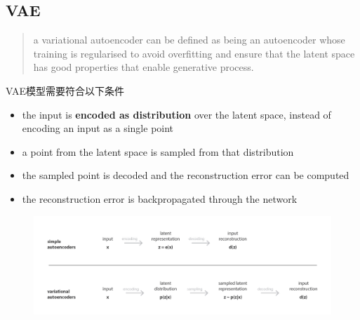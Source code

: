 \subsection{VAE}
\begin{quotation}
    a variational autoencoder can be defined as being an autoencoder whose training is
    regularised to avoid overfitting and ensure that the latent space has good properties
     that enable generative process.
\end{quotation}
VAE模型需要符合以下条件
\begin{itemize}
    \item the input is \textbf{encoded as distribution} over the latent space, instead of encoding an input as a single point
    \item a point from the latent space is sampled from that distribution
    \item the sampled point is decoded and the reconstruction error can be computed
    \item the reconstruction error is backpropagated through the network
\end{itemize}
\begin{figure}[H]
    \centering
    \includegraphics[width=16cm]{images/ae_vae.png}
    \label{fig:AEvsVAE}
\end{figure}

